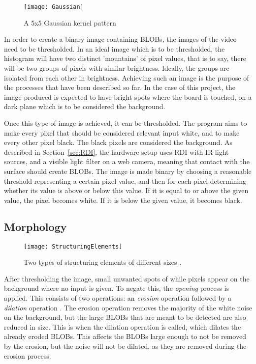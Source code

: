\begin{wrapfigure}{r}{0.32\textwidth}
\begin{center}
 \texttt{[image: Gaussian]}
  \end{center}
\caption{A 5x5 Gaussian kernel pattern \label{Fig:Gaussian}\citep{moeslund_introduction_2012}}
\end{wrapfigure}

In order to create a binary image containing BLOBs, the images of the video need to be thresholded. In an ideal image which is to be thresholded, the histogram will have two distinct 'mountains' of pixel values, that is to say, there will be two groups of pixels with similar brightness. Ideally, the groups are isolated from each other in brightness. Achieving such an image is the purpose of the processes that have been described so far. In the case of this project, the image produced is expected to have bright spots where the board is touched, on a dark plane which is to be considered the background.

Once this type of image is achieved, it can be thresholded. The program aims to make every pixel that should be considered relevant input white, and to make every other pixel black. The black pixels are considered the background. As described in Section~\ref{sec:RDI}, the hardware setup uses RDI with IR light sources, and a visible light filter on a web camera, meaning that contact with the surface should create BLOBs. The image is made binary by choosing a reasonable threshold representing a certain pixel value, and then for each pixel determining whether its value is above or below this value. If it is equal to or above the given value, the pixel becomes white. If it is below the given value, it becomes black.
 
\subsection{Morphology}

\begin{figure}[!h]
	\centering
\texttt{[image: StructuringElements]}
\caption{Two types of structuring elements of different sizes \citep{moeslund_introduction_2012}. \label{fig:StructuringElements}}
\end{figure}

After thresholding the image, small unwanted spots of while pixels appear on the background where no input is given. To negate this, the \textit{opening} process is applied. This consists of two operations: an \textit{erosion} operation followed by a \textit{dilation} operation \citep{moeslund_introduction_2012}. The erosion operation removes the majority of the white noise on the background, but the large BLOBs that are meant to be detected are also reduced in size. This is when the dilation operation is called, which dilates the already eroded BLOBs. This affects the BLOBs large enough to not be removed by the erosion, but the noise will not be dilated, as they are removed during the erosion process.

